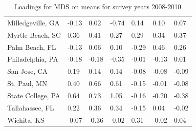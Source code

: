 \documentclass[11pt]{asaproc}
\begin{document}
\begin{table}[H]
\begin{center}
{\begin{tabular}{P{3.75cm}{r}{r}{r}{r}{r}{r}}
Milledgeville, GA & -0.13 & 0.02 & -0.74 & 0.14 & 0.10 & 0.07  \\
Myrtle Beach, SC &  0.36 & 0.41 & 0.27 & 0.29 & 0.34 & 0.37 \\
Palm Beach, FL &  -0.13 & 0.06 & 0.10 & -0.29 &  0.46 & 0.26 \\
Philadelphia, PA &  -0.18 & -0.18 & -0.35 & -0.01 & -0.13 & 0.01
\\
San Jose, CA &  0.19 & 0.14 & 0.14 & -0.08 & -0.08 & -0.09 \\
St. Paul, MN &  0.40 & 0.66 & 0.61 & -0.15 & -0.01 & -0.08 \\
State College, PA &  0.64 & 0.73 & 1.05 & -0.16 & -0.20 & -0.38 \\
Tallahassee, FL &  0.22 & 0.36 & 0.34 & -0.15 & 0.04 & -0.02 \\
Wichita, KS & -0.07 &  -0.36 & -0.02 & 0.31 & -0.02 & 0.04 \\
\hline
\end{tabular}}
\caption{Loadings for MDS on means for survey years 2008-2010}
\label{table:MDSmeans}
\end{center}
\end{table}
\end{document}

